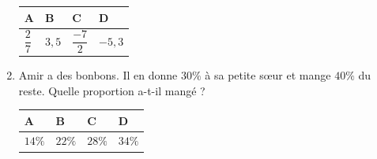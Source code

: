 \documentclass[oneside,12pt]{exam}          %
\begin{document}
\begin{enumerate}[label=\underline{Question \no\arabic*} :  , leftmargin=* , itemsep=5mm]
		\hspace{\linewidth-\textwidth}
		\renewcommand{\arraystretch}{1.75}
		\begin{tabular}{| P{0.22\textwidth} | P{0.22\textwidth} | P{0.22\textwidth} | P{0.22\textwidth} |} \hline
			A & B & C & D \\ \hline
			$\dfrac{2}{7}$ & $3,5$ & $\dfrac{-7}{2}$ & $-5,3$ \\ \hline
		\end{tabular}
		
		

	\item Amir a des bonbons. Il en donne $30\%$ à sa petite sœur et mange $40\%$ du reste. Quelle proportion a-t-il mangé ?
	
		\hspace{\linewidth-\textwidth}
		\renewcommand{\arraystretch}{1.5}
		\begin{tabular}{| P{0.22\textwidth} | P{0.22\textwidth} | P{0.22\textwidth} | P{0.22\textwidth} |} \hline
			A & B & C & D \\ \hline
			$14\%$ & $22\%$ & $28\%$ & $34\%$ \\ \hline
		\end{tabular}



\newpage
\end{enumerate}
\end{document}
